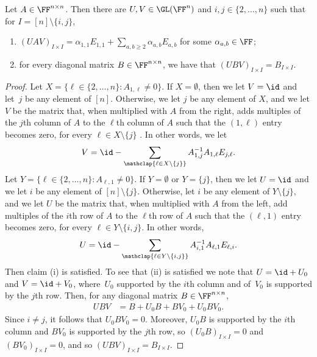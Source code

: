 \begin{lemma}\label{lem:diagonalize-ind2}
    Let $A \in \FF^{n \times n}$. Then there are $U,V \in \GL(\FF^n)$ and $i,j \in \{2,\ldots, n\}$ such that for $I = [n] \setminus\{i,j\}$,
    \begin{enumerate}[\upshape (i)]
    \item $(UAV)_{I\times I}  = \alpha_{1,1} E_{1,1} + \sum_{a,b \geq 2} \alpha_{a,b} E_{a,b}$ for some $\alpha_{a,b} \in \FF$;
    \item for every diagonal matrix $B\in \FF^{n\times n}$, we have that $(U B V)_{I\times I} = B_{I\times I}$.
    \end{enumerate}
\end{lemma}
\begin{proof}
    Let $X = \{\ell \in \{2, \ldots, n\} : A_{1, \ell} \neq 0\}$. If $X = \emptyset$, then we let $V = \id$ and let~$j$ be any element of $[n]$. Otherwise, we let $j$ be any element of $X$, and we let $V$ be the matrix that, when multiplied with $A$ from the right, adds multiples of the $j$th column of $A$ to the $\ell$th column of $A$ such that the $(1, \ell)$ entry becomes zero, for every $\ell \in X \setminus \{j\}$%
    . In other words, we let
    \[
    V = \id - \sum_{\mathclap{\ell \in X \setminus \{j\}}} A_{1,j}^{-1} A_{1,\ell} E_{j, \ell}.
    \]
    Let $Y = \{\ell \in \{2, \ldots, n\} : A_{\ell, 1} \neq 0\}$. If $Y= \emptyset$ or $Y = \{j\}$, then we let $U = \id$ and we let $i$ be any element of $[n] \setminus \{j\}$. Otherwise, let $i$ be any element of $Y \setminus \{j\}$, and we let $U$ be the matrix that, when multiplied with $A$ from the left, add multiples of the $i$th row of $A$ to the $\ell$th row of $A$ such that the $(\ell, 1)$ entry becomes zero, for every $\ell \in Y \setminus \{i,j\}$.
    In other words,
    \[
    U = \id - \sum_{\mathclap{\ell \in Y \setminus \{i,j\}}} A_{i,1}^{-1} A_{\ell,1} E_{\ell, i}.
    \]
    Then claim (i) is satisfied. 
    To see that (ii) is satisfied we note that $U = \id + U_0$ and $V = \id + V_0$, where~$U_0$ supported by the $i$th column and of~$V_0$ is supported by the $j$th row.
    Then, for any diagonal matrix $B \in \FF^{n\times n}$,
    \begin{align*}
        UBV &= B + U_0B + BV_0 + U_0BV_0.
    \end{align*}
    Since $i\ne j$, it follows that $U_0BV_0 = 0$.
    Moreover, $U_0B$ is supported by the $i$th column and $BV_0$ is supported by the $j$th row, so $(U_0B)_{I \times I}=0$ and $(BV_0)_{I \times I}=0$, and so $(UBV)_{I \times I} = B_{I\times I}$.
\end{proof}

